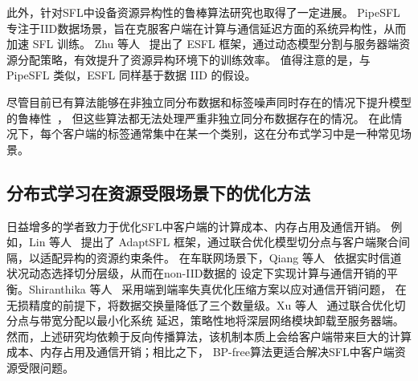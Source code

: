 此外，针对SFL中设备资源异构性的鲁棒算法研究也取得了一定进展。
PipeSFL~\cite{gao2024pipesfl} 专注于IID数据场景，旨在克服客户端在计算与通信延迟方面的系统异构性，从而加速 SFL 训练。
Zhu 等人~\cite{zhu2024esfl} 提出了 ESFL 框架，通过动态模型分割与服务器端资源分配策略，有效提升了资源异构环境下的训练效率。
值得注意的是，与 PipeSFL 类似，ESFL 同样基于数据 IID 的假设。

尽管目前已有算法能够在非独立同分布数据和标签噪声同时存在的情况下提升模型的鲁棒性~\cite{xu2022fedcorr,ji2024fedfixer,wu2023fednoro}，
但这些算法都无法处理严重非独立同分布数据存在的情况。
在此情况下，每个客户端的标签通常集中在某一个类别，这在分布式学习中是一种常见场景。
\subsection{分布式学习在资源受限场景下的优化方法}
日益增多的学者致力于优化SFL中客户端的计算成本、内存占用及通信开销。
例如，Lin 等人~\cite{lin2025adaptsfl} 提出了 AdaptSFL 框架，通过联合优化模型切分点与客户端聚合间隔，以适配异构的资源约束条件。
在车联网场景下，Qiang 等人~\cite{qiang2025split} 依据实时信道状况动态选择切分层级，从而在non-IID数据的
设定下实现计算与通信开销的平衡。Shiranthika 等人~\cite{shiranthika2024splitfedzip} 采用端到端率失真优化压缩方案以应对通信开销问题，
在无损精度的前提下，将数据交换量降低了三个数量级。Xu 等人~\cite{xu2023accelerating} 通过联合优化切分点与带宽分配以最小化系统
延迟，策略性地将深层网络模块卸载至服务器端。然而，上述研究均依赖于反向传播算法，该机制本质上会给客户端带来巨大的计算成本、内存占用及通信开销；相比之下，
BP-free算法更适合解决SFL中客户端资源受限问题。


